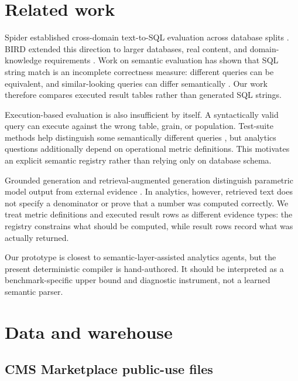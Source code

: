 \documentclass[11pt]{article}
\begin{document}
\section{Related work}

Spider established cross-domain text-to-SQL evaluation across database splits
\cite{spider}. BIRD extended this direction to larger databases, real content,
and domain-knowledge requirements \cite{bird}. Work on semantic evaluation has
shown that SQL string match is an incomplete correctness measure: different
queries can be equivalent, and similar-looking queries can differ semantically
\cite{testsuite,crossdomain}. Our work therefore compares executed result tables
rather than generated SQL strings.

Execution-based evaluation is also insufficient by itself. A syntactically valid
query can execute against the wrong table, grain, or population. Test-suite
methods help distinguish some semantically different queries \cite{testsuite},
but analytics questions additionally depend on operational metric definitions.
This motivates an explicit semantic registry rather than relying only on database
schema.

Grounded generation and retrieval-augmented generation distinguish parametric
model output from external evidence \cite{rag}. In analytics, however, retrieved
text does not specify a denominator or prove that a number was computed
correctly. We treat metric definitions and executed result rows as different
evidence types: the registry constrains what should be computed, while result
rows record what was actually returned.

Our prototype is closest to semantic-layer-assisted analytics agents, but the
present deterministic compiler is hand-authored. It should be interpreted as a
benchmark-specific upper bound and diagnostic instrument, not a learned semantic
parser.

\section{Data and warehouse}

\subsection{CMS Marketplace public-use files}
\end{document}
